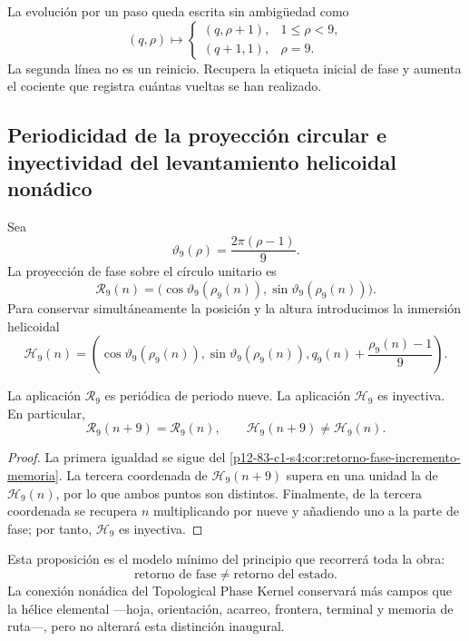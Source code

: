 La evolución por un paso queda escrita sin ambigüedad como
\[
 (q,\rho)\longmapsto
 \begin{cases}
 (q,\rho+1),&1\leq\rho<9,\\
 (q+1,1),&\rho=9.
 \end{cases}
\]
La segunda línea no es un reinicio. Recupera la etiqueta inicial de fase y
aumenta el cociente que registra cuántas vueltas se han realizado.

\subsection{Periodicidad de la proyección circular e inyectividad del levantamiento helicoidal nonádico}

Sea
\[
 \vartheta_9(\rho)=\frac{2\pi(\rho-1)}9.
\]
La proyección de fase sobre el círculo unitario es
\[
 \mathcal R_9(n)=
 \bigl(\cos\vartheta_9(\rho_9(n)),
       \sin\vartheta_9(\rho_9(n))\bigr).
\]
Para conservar simultáneamente la posición y la altura introducimos la
inmersión helicoidal
\[
 \mathcal H_9(n)=
 \left(
  \cos\vartheta_9(\rho_9(n)),
  \sin\vartheta_9(\rho_9(n)),
  q_9(n)+\frac{\rho_9(n)-1}{9}
 \right).
\]

\begin{proposition}
\label{p12-83-c1-s4:prop:rueda-no-determina-estado}
La aplicación \(\mathcal R_9\) es periódica de periodo nueve. La aplicación
\(\mathcal H_9\) es inyectiva. En particular,
\[
 \mathcal R_9(n+9)=\mathcal R_9(n),
 \qquad
 \mathcal H_9(n+9)\neq\mathcal H_9(n).
\]
\end{proposition}

\begin{proof}
La primera igualdad se sigue del
\cref{p12-83-c1-s4:cor:retorno-fase-incremento-memoria}. La tercera coordenada de
\(\mathcal H_9(n+9)\) supera en una unidad la de \(\mathcal H_9(n)\), por
lo que ambos puntos son distintos. Finalmente, de la tercera coordenada se
recupera \(n\) multiplicando por nueve y añadiendo uno a la parte de fase;
por tanto, \(\mathcal H_9\) es inyectiva.
\end{proof}

Esta proposición es el modelo mínimo del principio que recorrerá toda la
obra:
\[
 \boxed{\text{retorno de fase}\neq\text{retorno del estado}.}
\]
La conexión nonádica del Topological Phase Kernel conservará más campos que
la hélice elemental ---hoja, orientación, acarreo, frontera, terminal y
memoria de ruta---, pero no alterará esta distinción inaugural.

